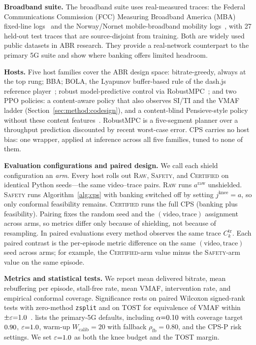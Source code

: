 \textbf{Broadband suite.} The broadband suite uses real-measured traces: the Federal Communications Commission (FCC) Measuring Broadband America (MBA) fixed-line logs~\cite{fcc2015mba} and the Norway/Nornet mobile-broadband mobility logs~\cite{kvalbein2014}, with 27 held-out test traces that are source-disjoint from training. Both are widely used public datasets in ABR research. They provide a real-network counterpart to the primary \mbox{5G} suite and show where banking offers limited headroom.

\textbf{Hosts.} Five host families cover the ABR design space: bitrate-greedy, always at the top rung; BBA; BOLA, the Lyapunov buffer-based rule of the dash.js reference player~\cite{spiteri2018bola,spiteri2018dashjs}; robust model-predictive control via RobustMPC~\cite{yin2015control}; and two PPO policies: a content-aware policy that also observes SI/TI and the VMAF ladder (Section~\ref{sec:method:codesign}), and a content-blind Pensieve-style policy without these content features~\cite{mao2017neural}. RobustMPC is a five-segment planner over a throughput prediction discounted by recent worst-case error. CPS carries no host bias: one wrapper, applied at inference across all five families, tuned to none of them.

\textbf{Evaluation configurations and paired design.} We call each shield configuration an \emph{arm}. Every host rolls out \textsc{Raw}, \textsc{Safety}, and \textsc{Certified} on identical Python seeds---the same video--trace pairs.
\textsc{Raw} runs \(a^{\mathrm{raw}}\) unshielded.
\textsc{Safety} runs Algorithm~\ref{alg:cps} with banking switched off by setting \(j^{\mathrm{knee}}{=}a\), so only conformal feasibility remains.
\textsc{Certified} runs the full CPS (banking plus feasibility).
Pairing fixes the random seed and the \((\text{video},\text{trace})\) assignment across arms, so metrics differ only because of shielding, not because of resampling.
In paired evaluations every method observes the same trace \(C^{\mathrm{tr}}_k\).
Each paired contrast is the per-episode metric difference on the same \((\text{video},\text{trace})\) seed across arms; for example, the \textsc{Certified}-arm value minus the \textsc{Safety}-arm value on the same episode.

\textbf{Metrics and statistical tests.} We report mean delivered bitrate, mean rebuffering per episode, stall-free rate, mean VMAF, intervention rate, and empirical conformal coverage. Significance rests on paired Wilcoxon signed-rank tests with zero-method \texttt{zsplit} and on TOST for equivalence of VMAF within \(\pm\varepsilon{=}1.0\)~\cite{lakens2017equivalence}.
 lists the primary-\mbox{5G} defaults, including \(\alpha{=}0.10\) with coverage target \(0.90\), \(\varepsilon{=}1.0\), warm-up \(W_{\mathrm{calib}}{=}20\) with fallback \(\rho_{\mathrm{fb}}{=}0.80\), and the CPS-P risk settings.
We set \(\varepsilon{=}1.0\) as both the knee budget and the TOST margin.

